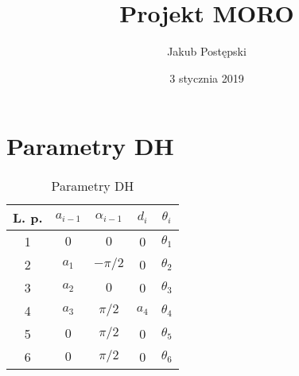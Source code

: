\documentclass[]{article}
\title{Projekt MORO}
\author{Jakub Postępski}
\date{3 stycznia 2019}
\begin{document}
\maketitle


\section{Parametry DH}

\begin{table}[H]
	\begin{tabular}{|| c | c c c c ||}
		\hline
		L. p. & $a_{i-1}$ & $\alpha_{i-1}$ & $d_i$ & $\theta_i$ \\ 
		\hline\hline
		1 & $ 0 $ & $0$ & 0 & $\theta_1$ \\
		\hline
		2 & $a_1$ & $-\pi/2$ & 0 & $\theta_2$ \\
		\hline
		3 & $a_2$ & $0$ & 0 & $\theta_3$ \\
		\hline
		4 & $a_3$ & $\pi/2$ & $a_4$ & $\theta_4$ \\
		\hline
		5 & $0$ & $\pi/2$ & 0 & $\theta_5$ \\
		\hline
		6 & $0$ & $\pi/2$ & 0 & $\theta_6$ \\
		\hline
		
		
		
	\end{tabular}
	\caption{Parametry DH}
	\label{tab1}
\end{table}
\end{document}
